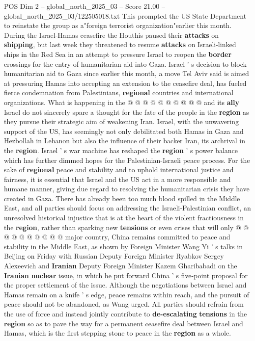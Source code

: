 \begin{textsample}{POS Dim 2 – global\_north\_2025\_03 – Score 21.00 – global\_north\_2025\_03/122505018.txt}
This prompted the US State Department to reinstate the group as a"foreign terrorist organization"earlier this month.
During the Israel-Hamas ceasefire the Houthis paused their \textbf{attacks} on \textbf{shipping}, but last week they threatened to resume \textbf{attacks} on Israeli-linked ships in the Red Sea in an attempt to pressure Israel to reopen the \textbf{border} crossings for the entry of humanitarian aid into Gaza.
Israel ' s decision to block humanitarian aid to Gaza since earlier this month, a move Tel Aviv said is aimed at pressuring Hamas into accepting an extension to the ceasefire deal, has fueled fierce condemnation from Palestinians, \textbf{regional} countries and international organizations.
What is happening in the @ @ @ @ @ @ @ @ @ @ and its \textbf{ally} Israel do not sincerely spare a thought for the fate of the people in the \textbf{region} as they pursue their strategic aim of weakening Iran.
Israel, with the unwavering support of the US, has seemingly not only debilitated both Hamas in Gaza and Hezbollah in Lebanon but also the influence of their backer Iran, its archrival in the \textbf{region}.
Israel ' s war machine has reshaped the \textbf{region} ' s power balance which has further dimmed hopes for the Palestinian-Israeli peace process.
For the sake of \textbf{regional} peace and stability and to uphold international justice and fairness, it is essential that Israel and the US act in a more responsible and humane manner, giving due regard to resolving the humanitarian crisis they have created in Gaza.
There has already been too much blood spilled in the Middle East, and all parties should focus on addressing the Israeli-Palestinian conflict, an unresolved historical injustice that is at the heart of the violent fractiousness in the \textbf{region}, rather than sparking new \textbf{tensions} or even crises that will only @ @ @ @ @ @ @ @ @ @ major country, China remains committed to peace and stability in the Middle East, as shown by Foreign Minister Wang Yi ' s talks in Beijing on Friday with Russian Deputy Foreign Minister Ryabkov Sergey Alexeevich and \textbf{Iranian} Deputy Foreign Minister Kazem Gharibabadi on the \textbf{Iranian} \textbf{nuclear} issue, in which he put forward China ' s five-point proposal for the proper settlement of the issue.
Although the negotiations between Israel and Hamas remain on a knife ' s edge, peace remains within reach, and the pursuit of peace should not be abandoned, as Wang urged.
All parties should refrain from the use of force and instead jointly contribute to \textbf{de-escalating} \textbf{tensions} in the \textbf{region} so as to pave the way for a permanent ceasefire deal between Israel and Hamas, which is the first stepping stone to peace in the \textbf{region} as a whole.

\end{textsample}

